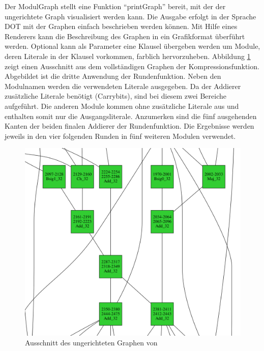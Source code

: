 Der ModulGraph stellt eine Funktion "`printGraph"' bereit, mit der der ungerichtete Graph visualisiert werden kann. Die Ausgabe erfolgt in der Sprache DOT \cite{lang:dot}
mit der Graphen einfach beschrieben werden können. Mit Hilfe eines Renderers kann die Beschreibung des Graphen in ein Grafikformat überführt werden.
Optional kann als Parameter eine Klausel übergeben werden um Module, deren Literale in der Klausel vorkommen, farblich hervorzuheben. Abbildung \ref{fig:sha256_graph}
zeigt einen Ausschnitt aus dem vollständigen Graphen der Kompressionsfunktion. Abgebildet ist die dritte Anwendung der Rundenfunktion. Neben den
Modulnamen werden die verwendeten Literale ausgegeben. Da der Addierer zusätzliche Literale benötigt (Carrybits), sind bei diesem zwei Bereiche aufgeführt.
Die anderen Module kommen ohne zusätzliche Literale aus und enthalten somit nur die Ausgangsliterale. Anzumerken sind die fünf ausgehenden Kanten der beiden
finalen Addierer der Rundenfunktion. Die Ergebnisse werden jeweils in den vier folgenden Runden in fünf weiteren Modulen verwendet.
\begin{figure}[!h]
  \centering
  \includegraphics[scale=0.43]{images/sha256graph}
  \caption{Ausschnitt des ungerichteten Graphen von }
  \label{fig:sha256_graph}
\end{figure}

